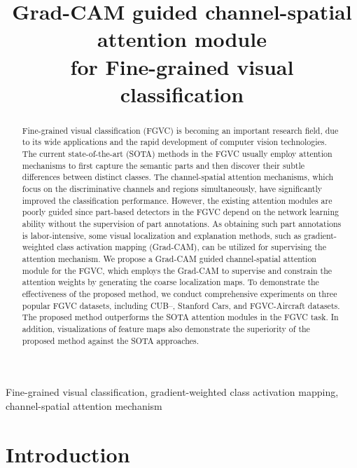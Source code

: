 \documentclass{article}
\begin{document}
\sloppy

\def\x{{\mathbf x}}
\def\L{{\cal L}}


\title{Grad-CAM guided channel-spatial attention module \\for Fine-grained visual classification }
\address{}


\maketitle


\begin{abstract}
Fine-grained visual classification (FGVC) is becoming an important research field, due to its wide applications and the rapid development of computer vision  technologies. The current state-of-the-art (SOTA) methods in the FGVC usually employ attention mechanisms to first capture the semantic parts and then discover their subtle differences between distinct classes. The channel-spatial attention mechanisms, which focus on the discriminative channels and regions simultaneously, have significantly improved the classification performance. However, the existing attention modules are poorly guided since part-based detectors in the FGVC depend on the network learning ability without the supervision of part annotations. As obtaining such part annotations is labor-intensive, some visual localization and explanation methods, such as gradient-weighted class activation mapping (Grad-CAM), can be utilized for supervising the attention mechanism. We propose a Grad-CAM guided channel-spatial attention module for the FGVC, which employs the Grad-CAM to supervise and constrain the attention weights by generating the coarse localization maps. To demonstrate the effectiveness of the proposed method, we conduct comprehensive experiments on three popular FGVC datasets, including CUB--, Stanford Cars, and FGVC-Aircraft datasets. The proposed method outperforms the SOTA attention modules in the FGVC task. In addition, visualizations of feature maps also demonstrate the superiority of the proposed method against the SOTA approaches.
\end{abstract}
\begin{keywords}
Fine-grained visual classification,  gradient-weighted class activation mapping, channel-spatial attention mechanism
\end{keywords}
\section{Introduction}
\label{sec:intro}
\end{document}
